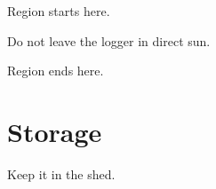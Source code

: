 \documentclass[11pt]{article}
\begin{document}
Region starts here.

\begin{shaded}
Do not leave the logger in direct sun.
\end{shaded}

Region ends here.

\section{Storage}
Keep it in the shed.
\end{document}
